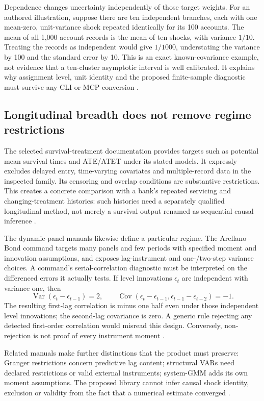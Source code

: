 Dependence changes uncertainty independently of those target weights.
For an authored illustration, suppose there are ten independent branches,
each with one mean-zero, unit-variance shock repeated identically for its
100 accounts. The mean of all 1,000 account records is the mean of ten
shocks, with variance $1/10$. Treating the records as independent would
give $1/1000$, understating the variance by 100 and the standard error by
10. This is an exact known-covariance example, not evidence that a
ten-cluster asymptotic interval is well calibrated. It explains why
assignment level, unit identity and the proposed finite-sample diagnostic
must survive any CLI or MCP conversion \cite{exec24_stata_choice}.

\subsection{Longitudinal breadth does not remove regime restrictions}
The selected survival-treatment documentation provides targets such as
potential mean survival times and ATE/ATET under its stated models. It
expressly excludes delayed entry, time-varying covariates and multiple-record
data in the inspected family. Its censoring and overlap conditions are
substantive restrictions. This creates a concrete comparison with a bank's
repeated servicing and changing-treatment histories: such histories need
a separately qualified longitudinal method, not merely a survival output
renamed as sequential causal inference
\cite{exec14_survival_stata,exec24_stata_choice}.

The dynamic-panel manuals likewise define a particular regime. The
Arellano--Bond command targets many panels and few periods with specified
moment and innovation assumptions, and exposes lag-instrument and
one-/two-step variance choices. A command's serial-correlation diagnostic
must be interpreted on the differenced errors it actually tests. If level
innovations $\epsilon_t$ are independent with variance one, then
\[
 \operatorname{Var}(\epsilon_t-\epsilon_{t-1})=2,\qquad
 \operatorname{Cov}(\epsilon_t-\epsilon_{t-1},
                    \epsilon_{t-1}-\epsilon_{t-2})=-1.
\]
The resulting first-lag correlation is minus one half even under those
independent level innovations; the second-lag covariance is zero. A generic
rule rejecting any detected first-order correlation would misread this
design. Conversely, non-rejection is not proof of every instrument moment
\cite{exec19_dynamic_stata_ab,exec24_stata_choice}.

Related manuals make further distinctions that the product must preserve:
Granger restrictions concern predictive lag content; structural VARs need
declared restrictions or valid external instruments; system-GMM adds its
own moment assumptions. The proposed library cannot infer causal shock
identity, exclusion or validity from the fact that a numerical estimate
converged \cite{exec13_ct_stata_granger,exec13_ct_stata_svar,
exec13_ct_stata_ivsvar,exec19_dynamic_stata_system,exec24_stata_choice}.

